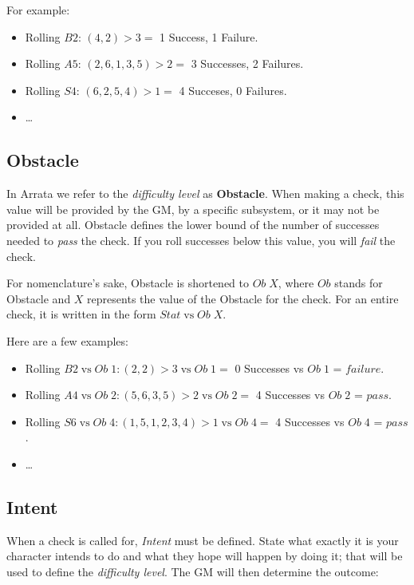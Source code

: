 \documentclass[../main.tex]{subfiles}
\begin{document}
    For example:

    \begin{itemize}
        \item Rolling $B2$: $(4, 2)>3 =$ 1 Success, 1 Failure.
        \item Rolling $A5$: $(2, 6, 1, 3, 5)>2 =$ 3 Successes, 2 Failures.
        \item Rolling $S4$: $(6, 2, 5, 4)>1 =$ 4 Succeses, 0 Failures.
        \item \dots
    \end{itemize}

    \subsection{Obstacle}

    In Arrata we refer to the {\em difficulty level} as \textbf{Obstacle}. When making a check, this value will be provided by the GM, by a specific subsystem, or it may not be provided at all. Obstacle defines the lower bound of the number of successes needed to {\em pass} the check. If you roll successes below this value, you will {\em fail} the check.

    For nomenclature's sake, Obstacle is shortened to $Ob\; X$, where $Ob$ stands for Obstacle and $X$ represents the value of the Obstacle for the check. For an entire check, it is written in the form $Stat\mathrm{\; vs \;}Ob\; X$.

    Here are a few examples:

    \begin{itemize}
        \item Rolling $B2\mathrm{\; vs \;}Ob\; 1: (2, 2)>3\mathrm{\; vs \;}Ob\; 1 =$ 0 Successes vs $Ob\; 1$ = $failure$.
        \item Rolling $A4\mathrm{\; vs \;}Ob\; 2: (5, 6, 3, 5)>2\mathrm{\; vs \;}Ob\; 2 =$ 4 Successes vs $Ob\; 2$ = $pass$.
        \item Rolling $S6\mathrm{\; vs \;}Ob\; 4: (1, 5, 1, 2, 3, 4)>1\mathrm{\; vs \;}Ob\; 4 =$ 4 Successes vs $Ob\; 4$ = $pass$.
        \item \dots
    \end{itemize}

    \subsection{Intent}

    When a check is called for, {\em Intent} must be defined. State what exactly it is your character intends to do and what they hope will happen by doing it; that will be used to define the {\em difficulty level}. The GM will then determine the outcome:
\end{document}
